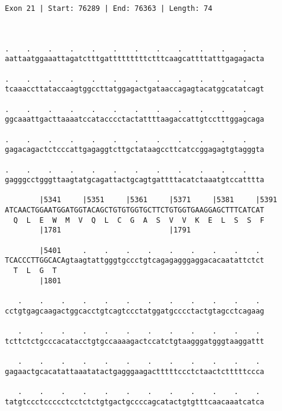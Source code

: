 \documentclass{article}
\begin{document}
\begin{Verbatim}
Exon 21 | Start: 76289 | End: 76363 | Length: 74



.    .    .    .    .    .    .    .    .    .    .    .    
aattaatggaaattagatctttgatttttttttctttcaagcattttatttgagagacta
                                                            
.    .    .    .    .    .    .    .    .    .    .    .    
tcaaaccttataccaagtggccttatggagactgataaccagagtacatggcatatcagt
                                                            
.    .    .    .    .    .    .    .    .    .    .    .    
ggcaaattgacttaaaatccatacccctactattttaagaccattgtcctttggagcaga
                                                            
.    .    .    .    .    .    .    .    .    .    .    .    
gagacagactctcccattgagaggtcttgctataagccttcatccggagagtgtagggta
                                                            
.    .    .    .    .    .    .    .    .    .    .    .    
gagggcctgggttaagtatgcagattactgcagtgattttacatctaaatgtccatttta
                                                            
        |5341     |5351     |5361     |5371     |5381     |5391
ATCAACTGGAATGGATGGTACAGCTGTGTGGTGCTTCTGTGGTGAAGGAGCTTTCATCAT
  Q  L  E  W  M  V  Q  L  C  G  A  S  V  V  K  E  L  S  S  F
        |1781                         |1791                 
  
        |5401     .    .    .    .    .    .    .    .    . 
TCACCCTTGGCACAgtaagtattgggtgccctgtcagagagggaggacacaatattctct
  T  L  G  T                                                
        |1801                                               
  
   .    .    .    .    .    .    .    .    .    .    .    . 
cctgtgagcaagactggcacctgtcagtccctatggatgcccctactgtagcctcagaag
                                                            
   .    .    .    .    .    .    .    .    .    .    .    . 
tcttctctgcccacatacctgtgccaaaagactccatctgtaagggatgggtaaggattt
                                                            
   .    .    .    .    .    .    .    .    .    .    .    . 
gagaactgcacatattaaatatactgagggaagactttttccctctaactctttttccca
                                                            
   .    .    .    .    .    .    .    .    .    .    .    . 
tatgtccctccccctcctctctgtgactgccccagcatactgtgtttcaacaaatcatca
                                                            

\end{Verbatim}
\end{document}
